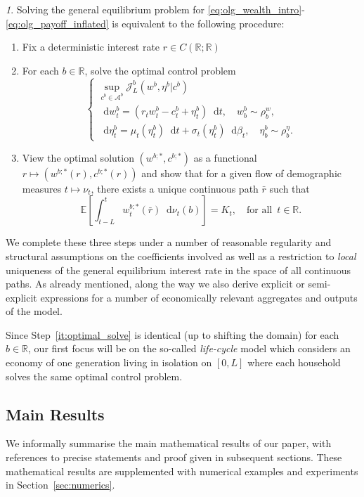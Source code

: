 \documentclass[11pt,oneside,english,reqno,dvipsnames,table]{amsart}
\numberwithin{equation}{section}
\theoremstyle{plain}
\theoremstyle{definition}
\theoremstyle{remark}
\newtheorem{rem}[thm]{\protect\remarkname}
\theoremstyle{plain}
\theoremstyle{plain}
\theoremstyle{plain}
\theoremstyle{plain}
\theoremstyle{plain}
\theoremstyle{plain}
\theoremstyle{plain}
\providecommand{\remarkname}{Remark}
\providecommand{\remarkname}{Remark}
\newcommand{\RR}{\mathbb{R}}
\newcommand{\dd}{\mathop{}\!\mathrm{d}}
\newcommand{\mcA}{\mathcal{A}}
\newcommand{\mcJ}{\mathcal{J}}
\newcommand{\mbE}{\mathbb{E}}
\newcommand{\mbR}{\mathbb{R}}
\numberwithin{thm}{section}
\begin{document}
\begin{rem}
Solving the general equilibrium problem for \eqref{eq:olg_wealth_intro}-\eqref{eq:olg_payoff_inflated} is equivalent to the following procedure:
%
\begin{enumerate}[label=\roman*)]
    \item \label{it:fix_rate} Fix a deterministic interest rate $r\in C(\mbR;\RR)$ 
    \item \label{it:optimal_solve} For each $b\in \mbR$, solve the optimal control problem 
    \begin{equation*}
        \begin{cases}
            \sup_{c^b \in \mcA^b} \mcJ^b_L(w^b,\eta^b|c^b)
            \\
            \dd w^b_t = (r_tw^b_t-c^b_t+\eta^b_t)\dd t , \quad w^b_b \sim \rho^w_b,
            \\
            \dd \eta^b_t = \mu_t(\eta^b_t)\dd t +\sigma_t(\eta^b_t) \dd \beta_t, \quad \eta^b_b \sim \rho^\eta_b.
        \end{cases}
    \end{equation*}
    \item \label{it:gen_eq_rate} View the optimal solution $(w^{b;*},c^{b;*})$ as a functional $r\mapsto  (w^{b;*}(r),c^{b;*}(r))$ and show that for a given flow of demographic measures $t\mapsto \nu_t$, there exists a unique continuous path $\bar{r}$ such that 
    \begin{equation*}
    	\mbE\left[ \int_{t-L}^t w^{b;*}_t(\bar{r}) \dd \nu_t(b)\right] = K_t,\quad \text{for all }\, t\in \mbR.
    \end{equation*}
\end{enumerate}
%
We complete these three steps under a number of reasonable regularity and structural assumptions on the coefficients involved as well as a restriction to \emph{local} uniqueness of the general equilibrium interest rate in the space of all continuous paths. As already mentioned, along the way we also derive explicit or semi-explicit expressions for a number of economically relevant aggregates and outputs of the model.
\end{rem}
%
Since Step~\ref{it:optimal_solve} is identical (up to shifting the domain) for each $b\in \mbR$, our first focus will be on the so-called \emph{life-cycle} model which considers an economy of one generation living in isolation on $[0,L]$ where each household solves the same optimal control problem. 

\subsection{Main Results} We informally summarise the main mathematical results of our paper, with references to precise statements and proof given in subsequent sections. These mathematical results are supplemented with numerical examples and experiments in Section~\ref{sec:numerics}.
\end{document}

